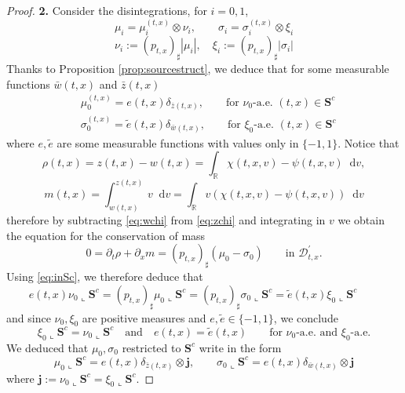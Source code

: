 \documentclass[11pt, twoside, reqno]{amsart}
\theoremstyle{definition}
\theoremstyle{remark}
\numberwithin{equation}{section}
\newcommand*\dif{\mathop{}\!\mathrm{d}}
\newcommand{\wt}[1]{\widetilde{#1}}
\begin{document}
\begin{proof}
    \vspace{0.3cm}
     \noindent \textbf{2.}  Consider the disintegrations, for $i= 0,1$,
     $$
     \mu_i = \mu_{i}^{(t,x)} \otimes \nu_i, \qquad \sigma_i = \sigma_{i}^{(t,x)} \otimes \xi_i$$
     $$\nu_i := (p_{t,x})_\sharp |\mu_i|, \quad \xi_i := (p_{t,x})_\sharp |\sigma_i|
     $$
Thanks to Proposition \ref{prop:sourcestruct}, we deduce that for some measurable functions $\bar w(t,x)$ and $\bar z(t,x)$
\begin{equation}\label{eq:inSc}
\begin{aligned}
& \mu_0^{(t,x)} = e(t,x)\delta_{\bar z(t,x)},\qquad \text{for  $\nu_0$-a.e. $(t,x) \in \mathbf S^c$} \\
& \sigma_0^{(t,x)} = \wt e(t,x)\delta_{\bar w(t,x)},\qquad \text{for  $\xi_0$-a.e. $(t,x) \in \mathbf S^c$}
\end{aligned}
\end{equation}
where $e, \wt e$ are some measurable functions with values only in $\{-1,1\}$.
Notice that 
$$
\rho(t,x) = z(t,x)- w(t,x) = \int_{\mathbb R} \chi(t,x,v) - \psi(t,x,v) \dif v, 
$$
$$
m(t,x) = \int_{w(t,x)}^{z(t,x)} v \dif v =  \int_{\mathbb R} v (\chi(t,x,v)-\psi(t,x,v)) \dif v
$$
therefore by subtracting \eqref{eq:wchi} from \eqref{eq:zchi} and integrating in $v$ we obtain the equation for the conservation of mass
\begin{equation}
    0 = \partial_t \rho + \partial_x m = (p_{t,x})_\sharp ( \mu_0 - \sigma_0)  \qquad \text{in $\mathscr D^\prime_{t,x}$}.
\end{equation}
Using \eqref{eq:inSc}, we therefore deduce that 
$$
e(t,x) \nu_0 \llcorner \mathbf S^c = (p_{t,x})_\sharp \mu_0\llcorner \mathbf S^c = (p_{t,x})_\sharp \sigma_0\llcorner \mathbf S^c = \wt e(t,x) \xi_0\llcorner \mathbf S^c \qquad 
$$
and since $\nu_0, \xi_0$ are positive measures and $e, \wt e \in \{-1, 1\}$, we conclude
\begin{equation}
   \xi_0\llcorner \mathbf S^c = \nu_0 \llcorner \mathbf S^c \quad \text{and} \quad  e(t,x) = \wt e(t,x) \qquad \text{for $\nu_0$-a.e. and $\xi_0$-a.e.}
\end{equation}
We deduced that $\mu_0, \sigma_0$ restricted to $\mathbf S^c$ write in the form
\begin{equation}\label{eq:sourceform}
    \mu_0 \llcorner \mathbf S^c = e(t,x) \delta_{\bar z(t,x)} \otimes \mathbf j, \qquad \sigma_0 \llcorner \mathbf S^c = e(t,x) \delta_{\bar w(t,x)} \otimes \mathbf j
\end{equation}
where $\mathbf j := \nu_0\llcorner \mathbf S^c = \xi_0\llcorner \mathbf S^c$.

\end{proof}
\end{document}
